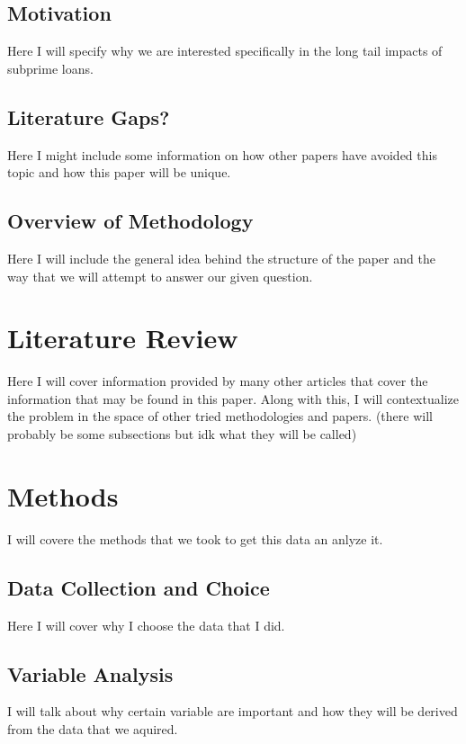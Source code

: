 \documentclass{article}
\begin{document}
\subsection{Motivation}
Here I will specify why we are interested specifically in the long tail impacts of subprime loans. 

\subsection{Literature Gaps?}
Here I might include some information on how other papers have avoided this topic and how this paper will
be unique.

\subsection{Overview of Methodology}
Here I will include the general idea behind the structure of the paper and the way that we will attempt to
answer our given question.

\section{Literature Review}
Here I will cover information provided by many other articles that cover the information that may be found
in this paper. Along with this, I will contextualize the problem in the space of other tried methodologies 
and papers. (there will probably be some subsections but idk what they will be called)

\section{Methods}
I will covere the methods that we took to get this data an anlyze it.

\subsection{Data Collection and Choice}
Here I will cover why I choose the data that I did.

\subsection{Variable Analysis}
I will talk about why certain variable are important and how they will be derived from the data that we 
aquired. 
\end{document}

